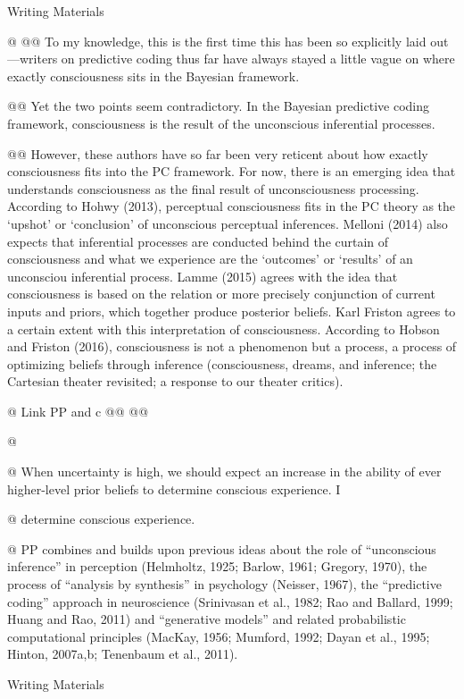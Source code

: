 \documentclass[utf8]{article}
\newenvironment{writingMaterials}
			{	
				\begin{tcolorbox}[size=small, colframe=black!20!white, toprule=1mm]
					Writing Materials
				\end{tcolorbox}

				\begin{easylist}[itemize]		
			}
			{
				\end{easylist}
				\begin{tcolorbox}[size=small, bottomrule=1mm, halign=flush right, colframe=black!20!white]
					Writing Materials
				\end{tcolorbox}			
			}
\begin{document}
		
			\begin{writingMaterials}
				
				@ \cite{lamme2015predictive}
					@@ To my knowledge, this is the first time this has been so explicitly laid out—writers on predictive coding thus far have always stayed a little vague on where exactly consciousness sits in the Bayesian framework.
					
					@@ Yet the two points seem contradictory. In the Bayesian predictive coding framework, consciousness is the result of the unconscious inferential processes. 
					
					
					@@ However, these authors have so far been very reticent about how exactly consciousness ﬁts into the PC framework. For now, there is an emerging idea that understands consciousness as the ﬁnal result of unconsciousness processing. According to Hohwy (2013), perceptual consciousness ﬁts in the PC theory as the ‘upshot’ or ‘conclusion’ of unconscious perceptual inferences. Melloni (2014) also expects that inferential processes are conducted behind the curtain of consciousness and what we experience are the ‘outcomes’ or ‘results’ of an unconsciou inferential process. Lamme (2015) agrees with the idea that consciousness is based on the relation or more precisely conjunction of current inputs and priors, which together produce posterior beliefs. Karl Friston agrees to a certain extent with this interpretation of consciousness. According to Hobson and Friston (2016), consciousness is not a phenomenon but a process, a process of optimizing beliefs through inference (consciousness, dreams, and inference; the Cartesian theater revisited; a response to our theater critics).
				
				
				@ Link PP and c
					@@ \cite{hobson2016response}
					@@ \cite{Melloni2015}
				
				@ \cite{SethPP2014} 
				
				@ When uncertainty is high, we should expect an increase in the ability of ever higher-level prior beliefs to determine conscious experience. I
				
				@ determine conscious experience. 
				
				@ PP combines and builds upon previous ideas about the role of “unconscious inference” in perception (Helmholtz, 1925; Barlow, 1961; Gregory, 1970), the process of “analysis by synthesis” in psychology (Neisser, 1967), the “predictive coding” approach in neuroscience (Srinivasan et al., 1982; Rao and Ballard, 1999; Huang and Rao, 2011) and “generative models” and related probabilistic computational principles (MacKay, 1956; Mumford, 1992; Dayan et al., 1995; Hinton, 2007a,b; Tenenbaum et al., 2011). 
				

\end{writingMaterials}
\end{document}
